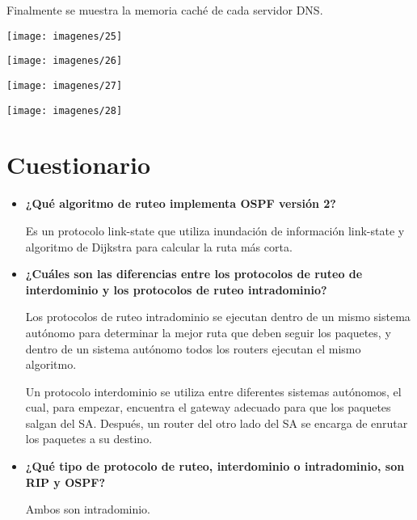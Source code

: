 \documentclass{article}
\begin{document}
Finalmente se muestra la memoria caché de cada servidor DNS.

\begin{center}
\texttt{[image: imagenes/25]}

\texttt{[image: imagenes/26]}

\texttt{[image: imagenes/27]}

\texttt{[image: imagenes/28]}
\end{center}

\section{Cuestionario}

\begin{itemize}
\item \textbf{¿Qué algoritmo de ruteo implementa OSPF versión 2?}

Es un protocolo link-state que utiliza inundación de información link-state y algoritmo de Dijkstra para calcular la ruta más corta.

\item \textbf{¿Cuáles son las diferencias entre los protocolos de ruteo de interdominio y los protocolos de
ruteo intradominio?}

Los protocolos de ruteo intradominio se ejecutan dentro de un mismo sistema autónomo para determinar la mejor ruta que deben seguir los paquetes, y dentro de un sistema autónomo todos los routers ejecutan el mismo algoritmo.

Un protocolo interdominio se utiliza entre diferentes sistemas autónomos, el cual, para empezar, encuentra el gateway adecuado para que los paquetes salgan del SA. Después, un router del otro lado del SA se encarga de enrutar los paquetes a su destino.

\item \textbf{¿Qué tipo de protocolo de ruteo, interdominio o intradominio, son RIP y OSPF?}

Ambos son intradominio.

\end{itemize}
\end{document}
